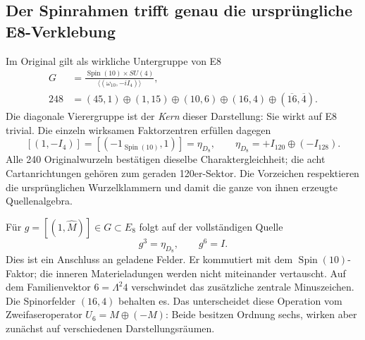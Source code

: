 
\subsection{Der Spinrahmen trifft genau die ursprüngliche E8-Verklebung}
Im Original gilt als wirkliche Untergruppe von E8
\begin{align}
G&=\frac{\operatorname{Spin}(10)\times SU(4)}
 {\langle(\omega_{10},-iI_4)\rangle},\\
248&=(45,1)\oplus(1,15)\oplus(10,6)
\oplus(16,4)\oplus(\overline{16},\overline4).
\end{align}
Die diagonale Vierergruppe ist der \emph{Kern} dieser Darstellung: Sie wirkt auf E8 trivial. Die einzeln wirksamen Faktorzentren erfüllen dagegen
\begin{equation}\label{eq:deckspinidentity}
[(1,-I_4)]=[(-1_{\operatorname{Spin}(10)},1)]
=\eta_{D_8},\qquad
\eta_{D_8}=+I_{120}\oplus(-I_{128}).
\end{equation}
Alle 240 Originalwurzeln bestätigen dieselbe Charaktergleichheit; die acht Cartanrichtungen gehören zum geraden 120er-Sektor. Die Vorzeichen respektieren die ursprünglichen Wurzelklammern und damit die ganze von ihnen erzeugte Quellenalgebra.

Für $g=[(1,\widehat M)]\in G\subset E_8$ folgt auf der vollständigen Quelle
\begin{equation}\label{eq:fullsourcesix}
\boxed{g^3=\eta_{D_8},\qquad g^6=I.}
\end{equation}
Dies ist ein Anschluss an geladene Felder. Er kommutiert mit dem $\operatorname{Spin}(10)$-Faktor; die inneren Materieladungen werden nicht miteinander vertauscht. Auf dem Familienvektor $6=\Lambda^2 4$ verschwindet das zusätzliche zentrale Minuszeichen. Die Spinorfelder $(16,4)$ behalten es. Das unterscheidet diese Operation vom Zweifaseroperator $U_6=M\oplus(-M)$: Beide besitzen Ordnung sechs, wirken aber zunächst auf verschiedenen Darstellungsräumen.

